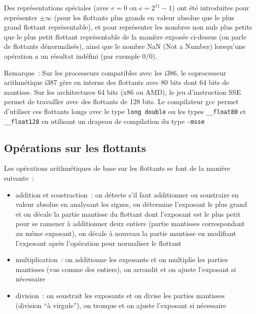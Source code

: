 \documentclass[a4paper,11pt]{book}
\begin{document}
\begin{giacjshere}
Des représentations spéciales (avec $e=0$ ou $e=2^{11}-1$) 
ont été introduites
pour représenter $\pm \infty$ (pour les flottants plus grands
en valeur absolue que le plus grand flottant représentable), et pour
repr\'esenter les
nombres non nuls plus petits que le plus petit flottant représentable
de la manière exposée ci-dessus (on parle de flottants dénormalisés),
ainsi que le nombre NaN (Not a Number) lorsqu'une opération a un résultat
indéfini (par exemple 0/0).

Remarque~: Sur les processeurs compatibles avec les i386, 
le coprocesseur arithmétique i387 gère en interne des flottants
avec 80 bits dont 64 bits de mantisse. Sur les architectures 64 bits
(x86 ou AMD), le jeu d'instruction SSE permet de travailler avec
des flottants de 128 bits. Le compilateur gcc permet d'utiliser
ces flottants longs avec le type \verb|long double| ou
les types \verb|__float80| et \verb|__float128| en utilisant
un drapeau de compilation du type \verb|-msse|

\subsection{Op\'erations sur les flottants}
Les opérations arithmétiques de base sur les flottants
se font de la manière suivante~:
\begin{itemize}
\item addition et soustraction~: on détecte s'il faut additionner
ou soustraire en valeur absolue en analysant les signes,
on détermine l'exposant le plus grand et on décale la partie mantisse 
du flottant dont l'exposant est le plus petit pour se ramener à additionner
deux entiers (partie mantisses correspondant au même exposant), 
on décale à nouveau la partie mantisse en modifiant l'exposant 
après l'opération pour normaliser le flottant
\item multiplication~: on additionne les exposants et on multiplie
les parties mantisses (vus comme des entiers), on arrondit et
on ajuste l'exposant si nécessaire
\item division~: on soustrait les exposants et on divise les parties
mantisses (division ``à virgule''), on tronque et on
ajuste l'exposant si nécessaire
\end{itemize}


\end{giacjshere}
\end{document}
